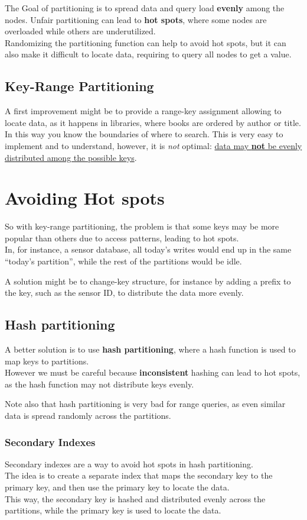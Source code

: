 The Goal of partitioning is to spread data and query load \textbf{evenly} among the nodes.
Unfair partitioning can lead to \textbf{hot spots}, where some nodes are overloaded while others are underutilized.\\
Randomizing the partitioning function can help to avoid hot spots, but it can also make it difficult to locate data, requiring to query all nodes to get a value.

\subsection{Key-Range Partitioning}
A first improvement might be to provide a range-key assignment allowing to locate data, as it happens in libraries, where books are ordered by author or title.\\
In this way you know the boundaries of where to search. This is very easy to implement and to understand,
however, it is \textit{not} optimal:
\ul{data may \textbf{not} be evenly distributed among the possible keys}.

\section{Avoiding Hot spots}
So with key-range partitioning, the problem is that some keys may be more popular than others due to access patterns, leading to hot spots.\\
In, for instance, a sensor database, all today's writes would end up in the same ``today's partition'', while the rest of the partitions would be idle.
\nl

A solution might be to change-key structure, for instance by adding a prefix to the key, such as the sensor ID, to distribute the data more evenly.

\subsection{Hash partitioning}
A better solution is to use \textbf{hash partitioning}, where a hash function is used to map keys to partitions.\\
However we must be careful because \textbf{inconsistent} hashing can lead to hot spots, as the hash function may not distribute keys evenly.

Note also that hash partitioning is very bad for range queries, as even similar data is spread randomly across the partitions.

\subsubsection{Secondary Indexes}
Secondary indexes are a way to avoid hot spots in hash partitioning.\\
The idea is to create a separate index that maps the secondary key to the primary key, and then use the primary key to locate the data.\\
This way, the secondary key is hashed and distributed evenly across the partitions, while the primary key is used to locate the data.


